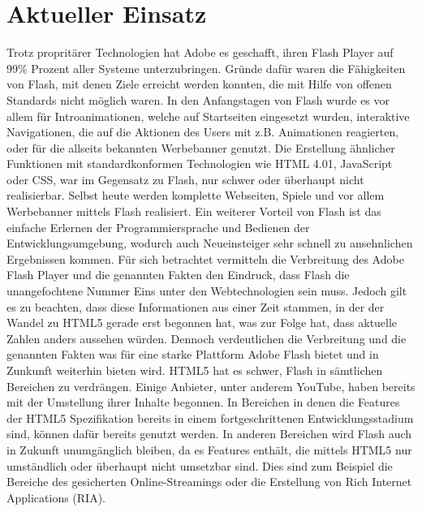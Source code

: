 \section{Aktueller Einsatz}
Trotz propritärer Technologien hat Adobe es geschafft, ihren Flash Player auf
99\% Prozent aller Systeme unterzubringen. Gründe dafür waren die Fähigkeiten
von Flash, mit denen Ziele erreicht werden konnten, die mit Hilfe von offenen
Standards nicht möglich waren. In den Anfangstagen von Flash wurde es vor
allem für Introanimationen, welche auf Startseiten eingesetzt wurden,
interaktive Navigationen, die auf die Aktionen des Users mit z.B. Animationen
reagierten, oder für die allseits bekannten Werbebanner genutzt. Die
Erstellung ähnlicher Funktionen mit standardkonformen Technologien wie
HTML 4.01, JavaScript oder CSS, war im Gegensatz zu Flash, nur schwer oder
überhaupt nicht realisierbar. Selbst heute werden komplette Webseiten, Spiele
und vor allem Werbebanner mittels Flash realisiert. Ein weiterer Vorteil von
Flash ist das einfache Erlernen der Programmiersprache und Bedienen der
Entwicklungsumgebung, wodurch auch Neueinsteiger sehr schnell zu ansehnlichen
Ergebnissen kommen.
\newline\newline
Für sich betrachtet vermitteln die Verbreitung des Adobe Flash Player und die
genannten Fakten den Eindruck, dass Flash die unangefochtene Nummer Eins unter
den Webtechnologien sein muss. Jedoch gilt es zu beachten, dass diese
Informationen aus einer Zeit stammen, in der der Wandel zu HTML5 gerade erst
begonnen hat, was zur Folge hat, dass aktuelle Zahlen anders aussehen würden.
Dennoch verdeutlichen die Verbreitung und die genannten Fakten was für eine
starke Plattform Adobe Flash bietet und in Zunkunft weiterhin bieten wird.
\newline\newline
HTML5 hat es schwer, Flash in sämtlichen Bereichen zu verdrängen. Einige
Anbieter, unter anderem YouTube, haben bereits mit der Umstellung ihrer
Inhalte begonnen. In Bereichen in denen die Features der HTML5 Spezifikation
bereits in einem fortgeschrittenen Entwicklungsstadium sind, können dafür
bereits genutzt werden. In anderen Bereichen wird Flash auch in Zukunft
unumgänglich bleiben, da es Features enthält, die mittels HTML5 nur
umständlich oder überhaupt nicht umsetzbar sind. Dies sind zum Beispiel die
Bereiche des gesicherten Online-Streamings oder die Erstellung von Rich
Internet Applications (RIA).
\newline\newline
